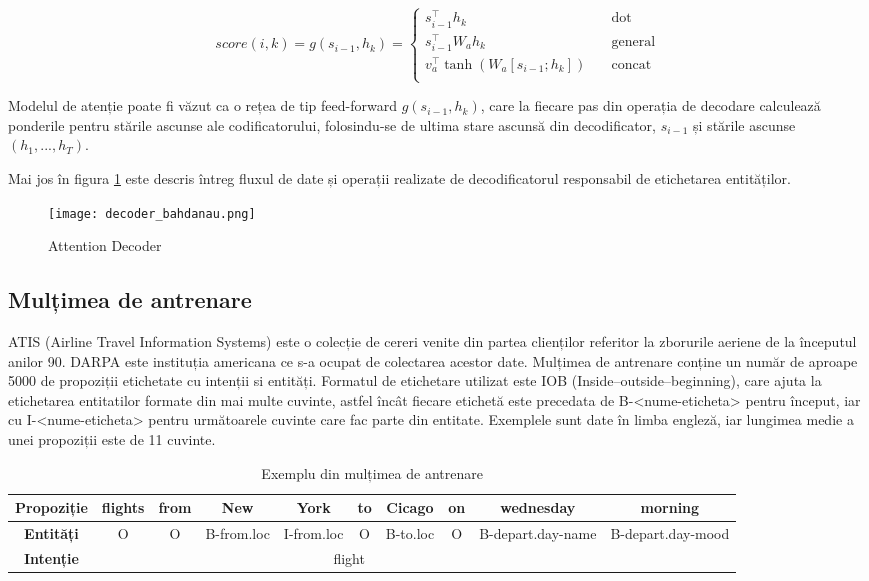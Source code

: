 \[ score(i, k) = g(s_{i-1}, h_k) =
\begin{cases}
s_{i-1}^\top h_k			&	\quad \text{dot}\\
s_{i-1}^\top W_a h_k	&	\quad \text{general}\\
v_a^\top \tanh(W_a [s_{i-1};h_k])	&	\quad \text{concat}\\
\end{cases}
\]

Modelul de atenție poate fi văzut ca o rețea de tip feed-forward $g(s_{i-1}, h_k)$, care la fiecare pas din operația de decodare calculează ponderile pentru stările ascunse ale codificatorului, folosindu-se de ultima stare ascunsă din decodificator, $s_{i-1}$ și stările ascunse $(h_1, ..., h_T)$.

Mai jos în figura \ref{fig:dec_bah} este descris întreg fluxul de date și operații realizate de decodificatorul responsabil de etichetarea entităților.

\begin{figure}[h]
	\centering
	\texttt{[image: decoder\_bahdanau.png]}
	\caption{Attention Decoder}
	\label{fig:dec_bah}
\end{figure}

\subsection{Mulțimea de antrenare}
ATIS (Airline Travel Information Systems) \cite{atis} este o colecție de cereri venite din partea clienților referitor la zborurile aeriene de la începutul anilor 90. DARPA este instituția americana ce s-a ocupat de colectarea acestor date. Mulțimea de antrenare conține un număr de aproape 5000 de propoziții etichetate cu intenții si entități. Formatul de etichetare utilizat este IOB (Inside–outside–beginning), care ajuta la etichetarea entitatilor formate din mai multe cuvinte, astfel încât fiecare etichetă este precedata de B-<nume-eticheta> pentru început, iar cu I-<nume-eticheta> pentru următoarele cuvinte care fac parte din entitate. Exemplele sunt date în limba engleză, iar lungimea medie a unei propoziții este de 11 cuvinte.

\begin{table}
	\centering
	\caption{Exemplu din mulțimea de antrenare}
	\label{atis_example}
	\begin{adjustbox}{max width=\textwidth}
		\begin{tabular}{ |c|c|c|c|c|c|c|c|c|c| } 
			\hline
			\textbf{Propoziție} & flights & from & New & York & to & Cicago & on & wednesday & morning \\ 
			\hline
			\textbf{Entități} & O & O & B-from.loc & I-from.loc & O & B-to.loc & O & B-depart.day-name & B-depart.day-mood \\
			\hline
			\textbf{Intenție} & \multicolumn{8}{c}{flight} &  \\ 
			\hline
		\end{tabular}
	\end{adjustbox}
\end{table}

